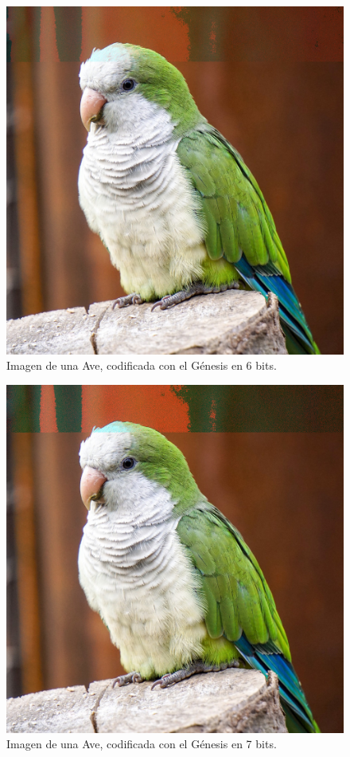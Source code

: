 \documentclass[conference]{IEEEtran}
\begin{document}
    \begin{figure}[H]
    \centering
    \includegraphics[width=0.9\linewidth]{image/birb6.png}
\caption{Imagen de una Ave, codificada con el Génesis en 6 bits.}
\end{figure}

    \begin{figure}[H]
    \centering
    \includegraphics[width=0.9\linewidth]{image/birb7.png}
\caption{Imagen de una Ave, codificada con el Génesis en 7 bits.}
\end{figure}
\end{document}

